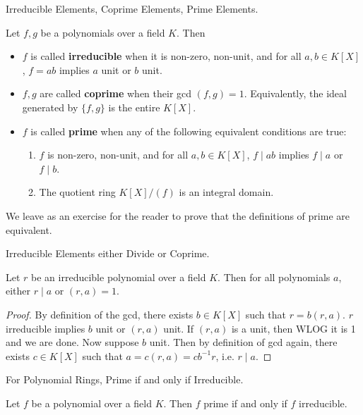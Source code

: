 \documentclass[../book.tex]{subfiles}
\begin{document}
\begin{dfn} Irreducible Elements, Coprime Elements, Prime Elements.
    
    Let $f, g$ be a polynomials over a field $K$. 
    Then \begin{itemize}
        \item $f$ is called \textbf{irreducible} when it is non-zero, non-unit, and
            for all $a, b \in K[X]$, $f = a b$ implies $a$ unit or $b$ unit.
        \item $f, g$ are called \textbf{coprime} when their gcd $(f,g) = 1$.
            Equivalently, the ideal generated by $\{f,g\}$ is the entire $K[X]$.
        \item $f$ is called \textbf{prime} when any of the following 
            equivalent conditions are true: 
            \begin{enumerate}
                \item $f$ is non-zero, non-unit, and for all $a, b \in K[X]$, 
                $f \mid ab$ implies $f \mid a$ or $f \mid b$.
                \item The quotient ring $K[X]/(f)$ is an integral domain.
            \end{enumerate}
    \end{itemize}
    We leave as an exercise for the reader to prove that
    the definitions of prime are equivalent. 
\end{dfn}
\begin{lem} Irreducible Elements either Divide or Coprime.
    
    Let $r$ be an irreducible polynomial over a field $K$.
    Then for all polynomials $a$, either $r \mid a$ or $(r,a) = 1$.
\end{lem}
\begin{proof}
    By definition of the gcd, there exists $b \in K[X]$ such that $r = b(r,a)$.
    $r$ irreducible implies $b$ unit or $(r,a)$ unit. 
    If $(r,a)$ is a unit, then WLOG it is 1 and we are done.
    Now suppose $b$ unit. Then by definition of gcd again, 
    there exists $c \in K[X]$ such that $a = c(r,a) = cb^{-1}r$, 
    i.e. $r \mid a$. 
\end{proof}
\begin{thm} For Polynomial Rings, Prime if and only if Irreducible.
    
    Let $f$ be a polynomial over a field $K$. 
    Then $f$ prime if and only if $f$ irreducible.
\end{thm}
\end{document}
